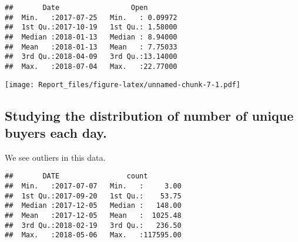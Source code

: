 \documentclass[]{article}
\newenvironment{Shaded}{\begin{snugshade}}{\end{snugshade}}
\newcommand{\KeywordTok}[1]{\textcolor[rgb]{0.13,0.29,0.53}{\textbf{#1}}}
\newcommand{\DataTypeTok}[1]{\textcolor[rgb]{0.13,0.29,0.53}{#1}}
\newcommand{\StringTok}[1]{\textcolor[rgb]{0.31,0.60,0.02}{#1}}
\newcommand{\OperatorTok}[1]{\textcolor[rgb]{0.81,0.36,0.00}{\textbf{#1}}}
\newcommand{\NormalTok}[1]{#1}
\begin{document}
\begin{verbatim}
##       Date                 Open         
##  Min.   :2017-07-25   Min.   : 0.09972  
##  1st Qu.:2017-10-19   1st Qu.: 1.58000  
##  Median :2018-01-13   Median : 8.94000  
##  Mean   :2018-01-13   Mean   : 7.75033  
##  3rd Qu.:2018-04-09   3rd Qu.:13.14000  
##  Max.   :2018-07-04   Max.   :22.77000
\end{verbatim}

\begin{Shaded}
\end{Shaded}

\texttt{[image: Report\_files/figure-latex/unnamed-chunk-7-1.pdf]}

\subsection{Studying the distribution of number of unique buyers each
day.}\label{studying-the-distribution-of-number-of-unique-buyers-each-day.}

We see outliers in this data.

\begin{Shaded}
\end{Shaded}

\begin{verbatim}
##       DATE                count          
##  Min.   :2017-07-07   Min.   :     3.00  
##  1st Qu.:2017-09-20   1st Qu.:    53.75  
##  Median :2017-12-05   Median :   148.00  
##  Mean   :2017-12-05   Mean   :  1025.48  
##  3rd Qu.:2018-02-19   3rd Qu.:   236.50  
##  Max.   :2018-05-06   Max.   :117595.00
\end{verbatim}
\end{document}
